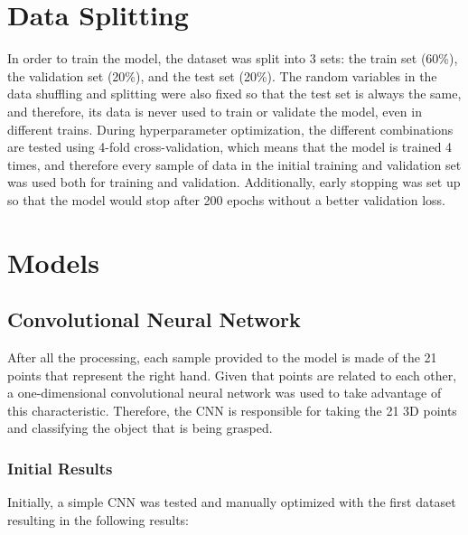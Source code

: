 \section{Data Splitting}

In order to train the model, the dataset was split into 3 sets: the train set (60\%), the validation set (20\%), and the test set (20\%). The random variables in the data shuffling and splitting were also fixed so that the test set is always the same, and therefore, its data is never used to train or validate the model, even in different trains. During hyperparameter optimization, the different combinations are tested using 4-fold cross-validation, which means that the model is trained 4 times, and therefore every sample of data in the initial training and validation set was used both for training and validation. Additionally, early stopping was set up so that the model would stop after 200 epochs without a better validation loss.

\section{Models}

\subsection{Convolutional Neural Network}

After all the processing, each sample provided to the model is made of the 21 points that represent the right hand. Given that points are related to each other, a one-dimensional convolutional neural network was used to take advantage of this characteristic. Therefore, the CNN is responsible for taking the 21 3D points and classifying the object that is being grasped.

\subsubsection{Initial Results}

Initially, a simple CNN was tested and manually optimized with the first dataset resulting in the following results:

